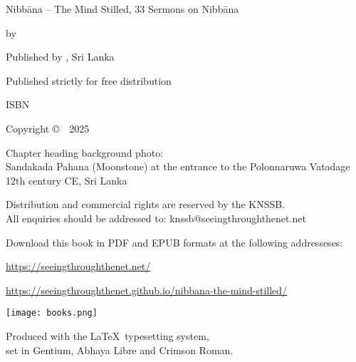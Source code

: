 \cleartoverso
\thispagestyle{empty}

{\copyrightsize
\centering
\setlength{\parindent}{0pt}%
\setlength{\parskip}{0.8\baselineskip}%

Nibbāna -- The Mind Stilled, 33 Sermons on Nibbāna

\ifthenelse{\equal{}{\theVolumeTitle}}{}{\textbf{\theVolumeTitle}}{}

by \theauthor

Published by \thePublisher, Sri Lanka

Published strictly for free distribution

ISBN \theISBN

Copyright \copyright\ \thePublisher\ 2025

Chapter heading background photo:\\
Sandakada Pahana (Moonstone) at the entrance to the Polonnaruwa Vatadage\\
12th century CE, Sri Lanka

Distribution and commercial rights are reserved by the KNSSB.\\
All enquiries should be addressed to: knssb@seeingthroughthenet.net

Download this book in PDF and EPUB formats at the following addresseses:

\href{https://seeingthroughthenet.net/}{https://seeingthroughthenet.net/}

\href{https://seeingthroughthenet.github.io/nibbana-the-mind-stilled/}{https://seeingthroughthenet.github.io/nibbana-the-mind-stilled/}

{\centering
\texttt{[image: books.png]}
\par}

{\footnotesize

Produced with the \LaTeX\ typesetting system,\\ set in Gentium, Abhaya Libre and Crimson Roman.

\theEditionInfo

}}
